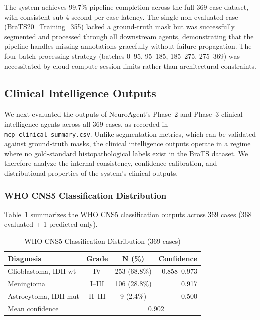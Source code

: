 The system achieves 99.7\% pipeline completion across the full 369-case dataset, with consistent sub-4-second per-case latency. The single non-evaluated case (BraTS20\_Training\_355) lacked a ground-truth mask but was successfully segmented and processed through all downstream agents, demonstrating that the pipeline handles missing annotations gracefully without failure propagation. The four-batch processing strategy (batches 0--95, 95--185, 185--275, 275--369) was necessitated by cloud compute session limits rather than architectural constraints.

\subsection{Clinical Intelligence Outputs}
We next evaluated the outputs of NeuroAgent's Phase~2 and Phase~3 clinical intelligence agents across all 369 cases, as recorded in \texttt{mcp\_clinical\_summary.csv}. Unlike segmentation metrics, which can be validated against ground-truth masks, the clinical intelligence outputs operate in a regime where no gold-standard histopathological labels exist in the BraTS dataset. We therefore analyze the internal consistency, confidence calibration, and distributional properties of the system's clinical outputs.

\subsubsection{WHO CNS5 Classification Distribution}
Table~\ref{tab:who_dist} summarizes the WHO CNS5 classification outputs across 369 cases (368 evaluated + 1 predicted-only).

\begin{table}[t]
\centering
\caption{WHO CNS5 Classification Distribution (369 cases)}
\label{tab:who_dist}
\begin{tabular}{lccr}
\hline
\textbf{Diagnosis} & \textbf{Grade} & \textbf{N (\%)} & \textbf{Confidence} \\
\hline
Glioblastoma, IDH-wt & IV & 253 (68.8\%) & 0.858--0.973 \\
Meningioma & I--III & 106 (28.8\%) & 0.917 \\
Astrocytoma, IDH-mut & II--III & 9 (2.4\%) & 0.500 \\
\hline
\multicolumn{2}{l}{Mean confidence} & \multicolumn{2}{c}{0.902} \\
\hline
\end{tabular}
\end{table}

